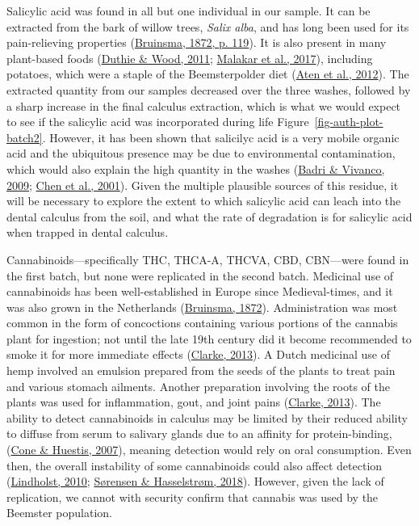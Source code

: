 \documentclass[
  b5paper,
]{book}
\begin{document}
Salicylic acid was found in all but one individual in our sample. It can
be extracted from the bark of willow trees, \emph{Salix alba}, and has
long been used for its pain-relieving properties
(\protect\hyperlink{ref-bruinsmaBijdragenTot1872}{Bruinsma, 1872, p.
119}). It is also present in many plant-based foods
(\protect\hyperlink{ref-duthieNaturalSalicylates2011}{Duthie \& Wood,
2011}; \protect\hyperlink{ref-malakarNaturallyOccurring2017}{Malakar et
al., 2017}), including potatoes, which were a staple of the
Beemsterpolder diet (\protect\hyperlink{ref-aten400Jaar2012}{Aten et
al., 2012}). The extracted quantity from our samples decreased over the
three washes, followed by a sharp increase in the final calculus
extraction, which is what we would expect to see if the salicylic acid
was incorporated during life Figure~\ref{fig-auth-plot-batch2}. However,
it has been shown that salicilyc acid is a very mobile organic acid and
the ubiquitous presence may be due to environmental contamination, which
would also explain the high quantity in the washes
(\protect\hyperlink{ref-badriRegulationFunction2009}{Badri \& Vivanco,
2009}; \protect\hyperlink{ref-chenCa2Dependent2001}{Chen et al., 2001}).
Given the multiple plausible sources of this residue, it will be
necessary to explore the extent to which salicylic acid can leach into
the dental calculus from the soil, and what the rate of degradation is
for salicylic acid when trapped in dental calculus.

Cannabinoids---specifically THC, THCA-A, THCVA, CBD, CBN---were found in
the first batch, but none were replicated in the second batch. Medicinal
use of cannabinoids has been well-established in Europe since
Medieval-times, and it was also grown in the Netherlands
(\protect\hyperlink{ref-bruinsmaBijdragenTot1872}{Bruinsma, 1872}).
Administration was most common in the form of concoctions containing
various portions of the cannabis plant for ingestion; not until the late
19th century did it become recommended to smoke it for more immediate
effects (\protect\hyperlink{ref-clarkeCannabisEvolution2013}{Clarke,
2013}). A Dutch medicinal use of hemp involved an emulsion prepared from
the seeds of the plants to treat pain and various stomach ailments.
Another preparation involving the roots of the plants was used for
inflammation, gout, and joint pains
(\protect\hyperlink{ref-clarkeCannabisEvolution2013}{Clarke, 2013}). The
ability to detect cannabinoids in calculus may be limited by their
reduced ability to diffuse from serum to salivary glands due to an
affinity for protein-binding,
(\protect\hyperlink{ref-coneInterpretationOral2007}{Cone \& Huestis,
2007}), meaning detection would rely on oral consumption. Even then, the
overall instability of some cannabinoids could also affect detection
(\protect\hyperlink{ref-lindholstLongTerm2010}{Lindholst, 2010};
\protect\hyperlink{ref-sorensenEffectAntioxidants2018}{Sørensen \&
Hasselstrøm, 2018}). However, given the lack of replication, we cannot
with security confirm that cannabis was used by the Beemster population.
\end{document}

